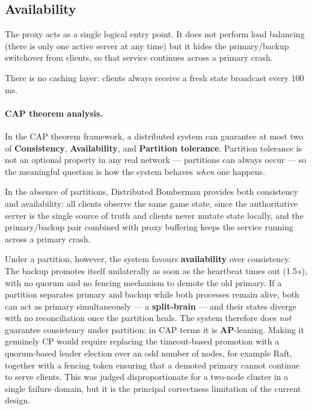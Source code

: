 \documentclass{scrartcl}
\begin{document}
\subsection{Availability}\label{availability}

The proxy acts as a single logical entry point.
It does not perform load balancing (there is only one active server at any time) but it hides the primary/backup switchover from clients, so that service continues across a primary crash.

There is no caching layer: clients always receive a fresh state broadcast every 100\,ms.

\paragraph{CAP theorem analysis.}
In the CAP theorem framework, a distributed system can guarantee at most two of
\textbf{Consistency}, \textbf{Availability}, and \textbf{Partition tolerance}.
Partition tolerance is not an optional property in any real network --- partitions
can always occur --- so the meaningful question is how the system behaves
\emph{when} one happens.

In the absence of partitions, Distributed Bomberman provides both consistency and
availability: all clients observe the same game state, since the authoritative
server is the single source of truth and clients never mutate state locally, and
the primary/backup pair combined with proxy buffering keeps the service running
across a primary crash.

Under a partition, however, the system favours \textbf{availability} over
consistency. The backup promotes itself unilaterally as soon as the heartbeat
times out (1.5\,s), with no quorum and no fencing mechanism to demote the old
primary. If a partition separates primary and backup while both processes remain
alive, both can act as primary simultaneously --- a \textbf{split-brain} --- and
their states diverge with no reconciliation once the partition heals. The system
therefore does \emph{not} guarantee consistency under partition: in CAP terms it
is \textbf{AP}-leaning. Making it genuinely CP would require replacing the
timeout-based promotion with a quorum-based leader election over an odd number of
nodes, for example Raft, together with a fencing token
ensuring that a demoted primary cannot continue to serve clients. This was judged
disproportionate for a two-node cluster in a single failure domain, but it is the
principal correctness limitation of the current design.
\end{document}
